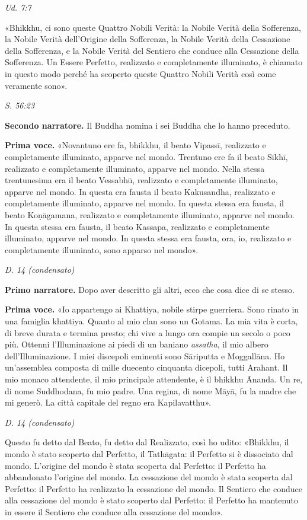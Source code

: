 \emph{Ud. 7:7}


«Bhikkhu, ci sono queste Quattro Nobili Verità: la Nobile Verità della
Sofferenza, la Nobile Verità dell’Origine della Sofferenza, la Nobile
Verità della Cessazione della Sofferenza, e la Nobile Verità del
Sentiero che conduce alla Cessazione della Sofferenza. Un Essere
Perfetto, realizzato e completamente illuminato, è chiamato in questo
modo perché ha scoperto queste Quattro Nobili Verità così come veramente
sono».


\emph{S. 56:23}


\textbf{Secondo narratore.} Il Buddha nomina i sei Buddha che lo hanno preceduto.


\textbf{Prima voce.} «Novantuno ere fa, bhikkhu, il beato Vipassī, realizzato e
completamente illuminato, apparve nel mondo. Trentuno ere fa il beato
Sikhī, realizzato e completamente illuminato, apparve nel mondo. Nella
stessa trentunesima era il beato Vessabhū, realizzato e completamente
illuminato, apparve nel mondo. In questa era fausta il beato Kakusandha,
realizzato e completamente illuminato, apparve nel mondo. In questa
stessa era fausta, il beato Koṇāgamana, realizzato e completamente
illuminato, apparve nel mondo. In questa stessa era fausta, il beato
Kassapa, realizzato e completamente illuminato, apparve nel mondo. In
questa stessa era fausta, ora, io, realizzato e completamente
illuminato, sono apparso nel mondo».


\emph{D. 14 (condensato)}


\textbf{Primo narratore.} Dopo aver descritto gli altri, ecco che cosa dice di se
stesso.


\textbf{Prima voce.} «Io appartengo ai Khattiya, nobile stirpe guerriera. Sono
rinato in una famiglia khattiya. Quanto al mio clan sono un Gotama. La
mia vita è corta, di breve durata e termina presto; chi vive a lungo ora
compie un secolo o poco più. Ottenni l’Illuminazione ai piedi di un
baniano \emph{assatha}, il mio albero dell’Illuminazione. I miei discepoli
eminenti sono Sāriputta e Moggallāna. Ho un’assemblea composta di
mille duecento cinquanta dicepoli, tutti Arahant. Il mio monaco
attendente, il mio principale attendente, è il bhikkhu Ānanda. Un re, di
nome Suddhodana, fu mio padre. Una regina, di nome Māyā, fu la madre che
mi generò. La città capitale del regno era Kapilavatthu».


\emph{D. 14 (condensato)}


Questo fu detto dal Beato, fu detto dal Realizzato, così ho udito:
«Bhikkhu, il mondo è stato scoperto dal Perfetto, il Tathāgata: il
Perfetto si è dissociato dal mondo. L’origine del mondo è stata scoperta
dal Perfetto: il Perfetto ha abbandonato l’origine del mondo. La
cessazione del mondo è stata scoperta dal Perfetto: il Perfetto ha
realizzato la cessazione del mondo. Il Sentiero che conduce alla
cessazione del mondo è stato scoperto dal Perfetto: il Perfetto ha
mantenuto in essere il Sentiero che conduce alla cessazione del mondo».


